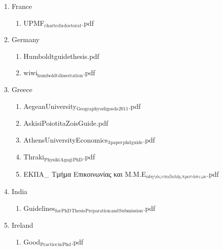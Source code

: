 \documentclass[11pt]{article}
\begin{document}
\begin{enumerate}
\begin{enumerate}
\begin{enumerate}
\item France
\label{sec-1-1-1-1-8-8-13-4}
\begin{enumerate}
\item UPMF$_{\text{charte}}$$_{\text{du}}$$_{\text{doctorat}}$.pdf
\label{sec-1-1-1-1-8-8-13-4-1}
\end{enumerate}

\item Germany
\label{sec-1-1-1-1-8-8-13-5}
\begin{enumerate}
\item Humboldtguidethesis.pdf
\label{sec-1-1-1-1-8-8-13-5-1}

\item wiwi$_{\text{humboldt}}$$_{\text{dissertation}}$.pdf
\label{sec-1-1-1-1-8-8-13-5-2}
\end{enumerate}

\item Greece
\label{sec-1-1-1-1-8-8-13-6}
\begin{enumerate}
\item AegeanUniversity$_{\text{Geography}}$$_{\text{odigos}}$$_{\text{ds}}$$_{\text{2011}}$.pdf
\label{sec-1-1-1-1-8-8-13-6-1}

\item AskisiPoiotitaZoisGuide.pdf
\label{sec-1-1-1-1-8-8-13-6-2}

\item AthensUniversityEconomics$_{\text{3}}$$_{\text{paper}}$$_{\text{phd}}$$_{\text{guide}}$.pdf
\label{sec-1-1-1-1-8-8-13-6-3}

\item Thraki$_{\text{Physiki}}$$_{\text{Agogi}}$$_{\text{PhD}}$.pdf
\label{sec-1-1-1-1-8-8-13-6-4}

\item ΕΚΠΑ\_ Τμήμα Επικοινωνίας και Μ.Μ.Ε$_{\text{οδηγός}}$$_{\text{υποβολής}}$$_{\text{προτάσεων}}$.pdf
\label{sec-1-1-1-1-8-8-13-6-5}
\end{enumerate}

\item India
\label{sec-1-1-1-1-8-8-13-7}
\begin{enumerate}
\item Guidelines$_{\text{for}}$$_{\text{PhD}}$$_{\text{Thesis}}$$_{\text{Preparation}}$$_{\text{and}}$$_{\text{Submission}}$.pdf
\label{sec-1-1-1-1-8-8-13-7-1}
\end{enumerate}

\item Ireland
\label{sec-1-1-1-1-8-8-13-8}
\begin{enumerate}
\item Good$_{\text{Practice}}$$_{\text{in}}$$_{\text{Phd}}$.pdf
\label{sec-1-1-1-1-8-8-13-8-1}


\end{enumerate}
\end{enumerate}
\end{enumerate}
\end{enumerate}
\end{document}
